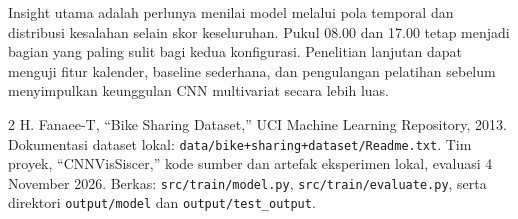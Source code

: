 \documentclass[10pt,conference]{IEEEtran}
\begin{document}
Insight utama adalah perlunya menilai model melalui pola temporal dan distribusi kesalahan selain skor keseluruhan. Pukul 08.00 dan 17.00 tetap menjadi bagian yang paling sulit bagi kedua konfigurasi. Penelitian lanjutan dapat menguji fitur kalender, baseline sederhana, dan pengulangan pelatihan sebelum menyimpulkan keunggulan CNN multivariat secara lebih luas.

\begin{thebibliography}{2}
 H. Fanaee-T, ``Bike Sharing Dataset,'' UCI Machine Learning Repository, 2013. Dokumentasi dataset lokal: \texttt{data/bike+sharing+dataset/Readme.txt}.
 Tim proyek, ``CNNVisSiscer,'' kode sumber dan artefak eksperimen lokal, evaluasi 4 November 2026. Berkas: \texttt{src/train/model.py}, \texttt{src/train/evaluate.py}, serta direktori \texttt{output/model} dan \texttt{output/test\_output}.
\end{thebibliography}
\end{document}
